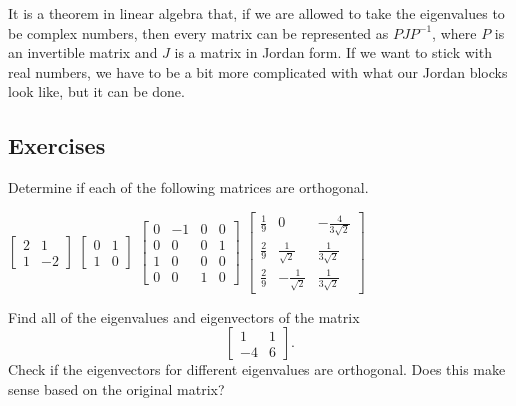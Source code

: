 It is a theorem in linear algebra that, if we are allowed to take the eigenvalues to be complex numbers, then every matrix can be represented as $PJP^{-1}$, where $P$ is an invertible matrix and $J$ is a matrix in Jordan form. If we want to stick with real numbers, we have to be a bit more complicated with what our Jordan blocks look like, but it can be done. 

\subsection{Exercises}


\begin{exercise}\ansMark%
Determine if each of the following matrices are orthogonal.
\begin{tasks}
\task $\displaystyle \begin{bmatrix}2 & 1 \\ 1 & -2 \end{bmatrix}$
\task $\displaystyle \begin{bmatrix}0 & 1 \\ 1 & 0 \end{bmatrix}$
\task $\displaystyle \begin{bmatrix} 0 & -1 & 0 & 0 \\ 0& 0 & 0 & 1 \\ 1 & 0 & 0 & 0 \\ 0 & 0 & 1 & 0 \end{bmatrix}$
\task $\displaystyle \begin{bmatrix} \frac{1}{9} & 0 & -\frac{4}{3\sqrt{2}} \\ \frac{2}{9} & \frac{1}{\sqrt{2}} & \frac{1}{3\sqrt{2}} \\ \frac{2}{9} & -\frac{1}{\sqrt{2}} & \frac{1}{3\sqrt{2}}  \end{bmatrix}$
\end{tasks}
\end{exercise}
%

\begin{exercise}\ansMark%
Find all of the eigenvalues and eigenvectors of the matrix
\[ \begin{bmatrix}1 & 1 \\ -4 & 6 \end{bmatrix}. \]
Check if the eigenvectors for different eigenvalues are orthogonal. Does this make sense based on the original matrix?
\end{exercise}
%


